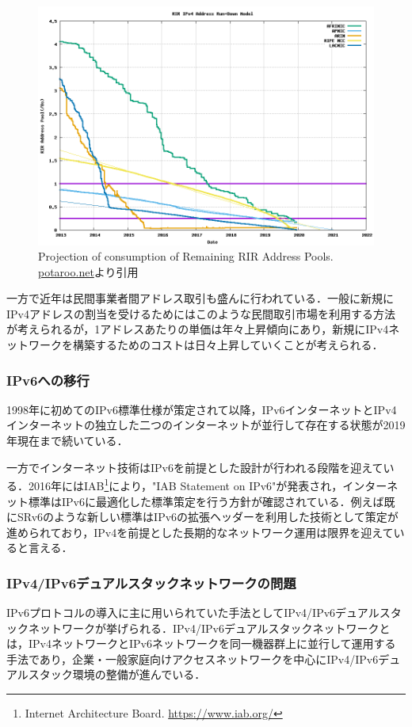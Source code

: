 \begin{figure}
	\centering
	\includegraphics[width=12cm]{img/plotend.png}
	\caption{Projection of consumption of Remaining RIR Address Pools. \url{potaroo.net}より引用\cite{potaroo_IPv4}}
	\label{fig:potaroo_IPv4}
\end{figure}
    
一方で近年は民間事業者間アドレス取引も盛んに行われている．一般に新規にIPv4アドレスの割当を受けるためにはこのような民間取引市場を利用する方法が考えられるが，1アドレスあたりの単価は年々上昇傾向にあり\cite{howard2013internet}，新規にIPv4ネットワークを構築するためのコストは日々上昇していくことが考えられる．


\subsubsection{IPv6への移行}
\label{introduction:background:ipv6_transition}
1998年に初めてのIPv6標準仕様が策定されて以降\cite{RFC2460}，IPv6インターネットとIPv4インターネットの独立した二つのインターネットが並行して存在する状態が2019年現在まで続いている．

一方でインターネット技術はIPv6を前提とした設計が行われる段階を迎えている．2016年にはIAB\footnote{Internet Architecture Board. \url{https://www.iab.org/}}により，"IAB Statement on IPv6"が発表され，インターネット標準はIPv6に最適化した標準策定を行う方針が確認されている\cite{IAB_statement}．例えば既にSRv6のような新しい標準はIPv6の拡張ヘッダーを利用した技術として策定が進められており，IPv4を前提とした長期的なネットワーク運用は限界を迎えていると言える．

\subsubsection{IPv4/IPv6デュアルスタックネットワークの問題}
\label{introduction:background:dualstack_problems}
IPv6プロトコルの導入に主に用いられていた手法としてIPv4/IPv6デュアルスタックネットワークが挙げられる\cite{durand2001deploying}．IPv4/IPv6デュアルスタックネットワークとは，IPv4ネットワークとIPv6ネットワークを同一機器群上に並行して運用する手法であり，企業・一般家庭向けアクセスネットワークを中心にIPv4/IPv6デュアルスタック環境の整備が進んでいる．

